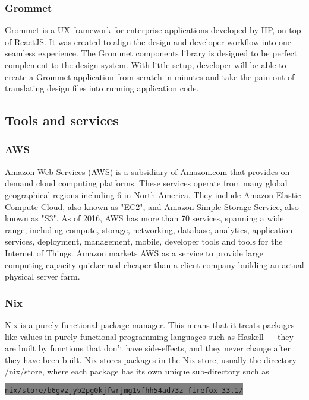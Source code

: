 \subsubsection{Grommet}
Grommet \cite{grommet} is a UX framework for enterprise applications developed by HP, on top of
ReactJS. It was created to align the design and developer workflow into one
seamless experience. The Grommet components \cite{grommet_comp} library is designed to be perfect
complement to the design system. With little setup, developer will be able to
create a Grommet application from scratch in minutes and take the pain out of
translating design files into running application code.

\subsection{Tools and services}
\subsubsection{AWS}
Amazon Web Services (AWS) is a subsidiary of Amazon.com that provides on-demand
cloud computing platforms. These services operate from many global geographical
regions including 6 in North America. They include Amazon Elastic Compute
Cloud, also known as "EC2", and Amazon Simple Storage Service, also known as
"S3". As of 2016, AWS has more than 70 services, spanning a wide range,
including compute, storage, networking, database, analytics, application
services, deployment, management, mobile, developer tools and tools for the
Internet of Things. Amazon markets AWS as a service to provide large computing
capacity quicker and cheaper than a client company building an actual physical
server farm.

\subsubsection{Nix}

Nix \cite{nix_elphd} is a purely functional package manager. This means that it treats packages
like values in purely functional programming languages such as Haskell — they
are built by functions that don’t have side-effects, and they never change after
they have been built. Nix stores packages in the Nix store, usually the
directory /nix/store, where each package has its own unique sub-directory such as

\colorbox{Gray}{\lstinline{nix/store/b6gvzjyb2pg0kjfwrjmg1vfhh54ad73z-firefox-33.1/}}

